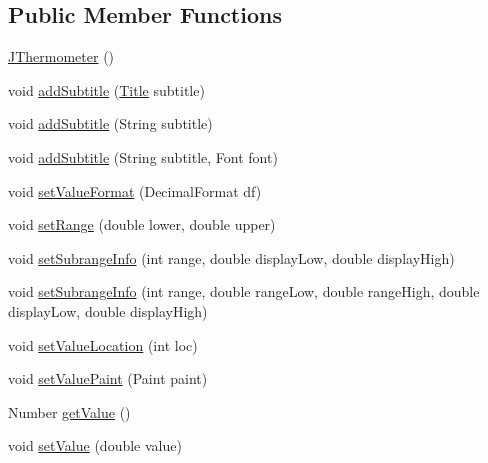 \subsection*{Public Member Functions}
\begin{DoxyCompactItemize}
\item 
\mbox{\hyperlink{classorg_1_1jfree_1_1chart_1_1plot_1_1_j_thermometer_ac14cf2a3cc450160b4698bfc2c8ee973}{J\+Thermometer}} ()
\item 
void \mbox{\hyperlink{classorg_1_1jfree_1_1chart_1_1plot_1_1_j_thermometer_a279884f8bdd616f48989958751eb6ae3}{add\+Subtitle}} (\mbox{\hyperlink{classorg_1_1jfree_1_1chart_1_1title_1_1_title}{Title}} subtitle)
\item 
void \mbox{\hyperlink{classorg_1_1jfree_1_1chart_1_1plot_1_1_j_thermometer_ade4d0ce8819e342a95959c30e4d21d94}{add\+Subtitle}} (String subtitle)
\item 
void \mbox{\hyperlink{classorg_1_1jfree_1_1chart_1_1plot_1_1_j_thermometer_afb58edaffc008d38ff2478c0bb5e8fce}{add\+Subtitle}} (String subtitle, Font font)
\item 
void \mbox{\hyperlink{classorg_1_1jfree_1_1chart_1_1plot_1_1_j_thermometer_aefa1e7fb393c5c9c910f1c8f7e6172a5}{set\+Value\+Format}} (Decimal\+Format df)
\item 
void \mbox{\hyperlink{classorg_1_1jfree_1_1chart_1_1plot_1_1_j_thermometer_ae0aabed864c10181d2e4ddbccf561c8c}{set\+Range}} (double lower, double upper)
\item 
void \mbox{\hyperlink{classorg_1_1jfree_1_1chart_1_1plot_1_1_j_thermometer_af422ebe30b579b3d78f354cbde6772d1}{set\+Subrange\+Info}} (int range, double display\+Low, double display\+High)
\item 
void \mbox{\hyperlink{classorg_1_1jfree_1_1chart_1_1plot_1_1_j_thermometer_a6688d2ef4c7a3af38b7e421b3c480f8d}{set\+Subrange\+Info}} (int range, double range\+Low, double range\+High, double display\+Low, double display\+High)
\item 
void \mbox{\hyperlink{classorg_1_1jfree_1_1chart_1_1plot_1_1_j_thermometer_a97aa285915df73603f68ef8cd819f1fd}{set\+Value\+Location}} (int loc)
\item 
void \mbox{\hyperlink{classorg_1_1jfree_1_1chart_1_1plot_1_1_j_thermometer_ab93b16285be4990eabb24e498288c352}{set\+Value\+Paint}} (Paint paint)
\item 
Number \mbox{\hyperlink{classorg_1_1jfree_1_1chart_1_1plot_1_1_j_thermometer_a250e1a60a78c27b65741a164202a3e2b}{get\+Value}} ()
\item 
void \mbox{\hyperlink{classorg_1_1jfree_1_1chart_1_1plot_1_1_j_thermometer_a9be493a01bc91d9ce5b0e667b589e495}{set\+Value}} (double value)

\end{DoxyCompactItemize}
